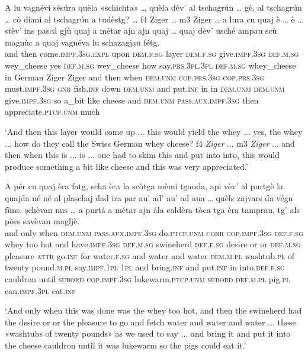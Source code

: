 \begin{linenumbers}
	\gll   A lu vagnévi sésúra quèla «schichta»\footnotemark{} … quèla dèv’ al tschagrún … gè, al tschagrún … cò diani al tschagrún a tudèstg? … {\ob}f4{\cb} Ziger … {\ob}m3{\cb} Ziger …  a lura cu quaj è … è … stèv’ ins pascá gjù quaj a métar ajn ajn quaj … quaj dèv’ usché ampau scù magnùc a quaj vagnéva lu schazagjau fétg.\\
	and then come.\textsc{impf.3sg.expl} upon \textsc{dem.f.sg} layer {} \textsc{dem.f.sg} give.\textsc{impf.3sg} \textsc{def.m.sg} wey\_cheese {} yes \textsc{def.m.sg} wey\_cheese {} how say.\textsc{prs.3pl.3pl} \textsc{def.m.sg} whey\_cheese in German {} {} Ziger {} {} Ziger {} and then when \textsc{dem.unm} \textsc{cop.prs.3sg} {} \textsc{cop.prs.3sg} {}  must.\textsc{impf.3sg} \textsc{gnr} fish.\textsc{inf} down \textsc{dem.unm} and put.\textsc{inf} in in \textsc{dem.unm} {} \textsc{dem.unm} give.\textsc{impf.3sg} so a\_bit like cheese and \textsc{dem.unm} \textsc{pass.aux.impf.3sg} then appreciate.\textsc{ptcp.unm} much \\
\end{linenumbers}
\medskip
\glt `And then this layer would come up ... this would yield the whey ... yes, the whey ... how do they call the Swiss German whey cheese? {\ob}f4{\cb} \textit{Ziger} ... {\ob}m3{\cb} \textit{Ziger} ... and then when this is ... is ... one had to skim this and put into into, this would produce something a bit like cheese and this was very appreciated.'
\medskip

\begin{linenumbers}
	\gll  A pér cu quaj èra fatg, scha èra la scòtga mèmi tgauda, api vèv’ al purtgè  la quajda né né al plaṣchaj dad ira par au’ ad’ au’ ad aua …  quèls zajvars da végn fùns, ṣchèvan nus … a purtá a métar ajn ála caldèra tòca tga èra tamprau, tg’ als pòrs savèvan magljè.  \\
	and only when \textsc{dem.unm} \textsc{pass.aux.impf.3sg} do.\textsc{ptcp.unm} \textsc{corr} \textsc{cop.impf.3sg} \textsc{def.f.sg} whey too hot and have.\textsc{impf.3sg} \textsc{def.m.sg} swineherd \textsc{def.f.sg} desire or or \textsc{def.m.sg} pleasure \textsc{attr} go.\textsc{inf} for water.\textsc{f.sg} and water and water {} \textsc{dem.m.pl} washtub.\textsc{pl} of twenty pound.\textsc{m.pl} say.\textsc{impf.1pl} \textsc{1pl} {} and bring.\textsc{inf} and put.\textsc{inf} in into.\textsc{def.f.sg} cauldron until \textsc{subord} \textsc{cop.impf.3sg} lukewarm.\textsc{ptcp.unm} \textsc{subord} \textsc{def.m.pl} pig.\textsc{pl} can.\textsc{impf.3pl} eat.\textsc{inf}\\
\end{linenumbers}
\medskip
\glt `And only when this was done was the whey too hot, and then the swineherd had the desire or or the pleasure to go and fetch water and water and water ... these «washtubs of twenty pounds» as we used to say ... and bring it and put it into the cheese cauldron until it was lukewarm so the pigs could eat it.'
\medskip

